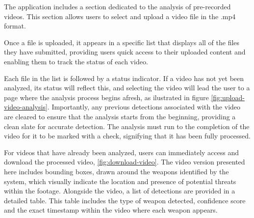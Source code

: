 The application includes a section dedicated to the analysis of pre-recorded videos. This section 
allows users to select and upload a video file in the .mp4 format. %


Once a file is uploaded, it appears in a specific list that displays all of the files they have submitted, providing 
users quick access to their uploaded content and enabling them to track the status of each video.

Each file in the list is followed by a status indicator. If a video has not yet been analyzed, its status 
will reflect this, and selecting the video will lead the user to a page where the analysis process begins afresh, 
as ilustrated in figure \ref{fig:upload-video-analysis}. 
Importantly, any previous detections associated with the video are cleared to ensure that the analysis starts from 
the beginning, providing a clean slate for accurate detection. The analysis must run to the completion of the video 
for it to be marked with a check, signifying that it has been fully processed.

For videos that have already been analyzed, users can immediately access and download the processed video, \ref{fig:download-video}. 
The video version presented here includes bounding boxes, drawn around the weapons identified by the system, which 
visually indicate the location and presence of potential threats within the footage. 
Alongside the video, a list of detections are provided in a detailed table. 
This table includes the type of weapon detected, confidence score and the exact timestamp within the video where each 
weapon appears.

